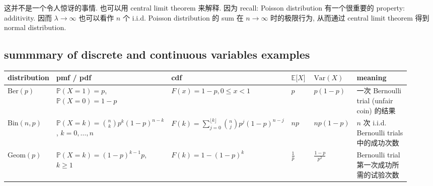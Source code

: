 这并不是一个令人惊讶的事情. 也可以用 central limit theorem 来解释. 因为 recall: Poisson distribution 有一个很重要的 property: additivity. 因而 \(\mathit{\lambda}\rightarrow\infty\) 也可以看作 \(\mathit{n}\) 个 i.i.d. Poisson distribution 的 sum 在 \(\mathit{n}\rightarrow\infty\) 时的极限行为, 从而通过 central limit theorem 得到 normal distribution.

\begin{landscape}
\subsection{summmary of discrete and continuous variables examples}\label{summmary-of-discrete-and-continuous-variables-examples}

{\def\LTcaptype{none} %
\footnotesize\setlength{\tabcolsep}{3pt}\renewcommand{\arraystretch}{1.4}
\begin{longtable}[]{@{}p{0.12\linewidth}p{0.25\linewidth}p{0.25\linewidth}p{0.06\linewidth}p{0.07\linewidth}p{0.18\linewidth}@{}}
\toprule\noalign{}
\textbf{distribution} & \textbf{pmf / pdf} & \textbf{cdf} & \textbf{\(\mathbb{E}\lbrack\mathit{X}\rbrack\)} & \textbf{\(\text{Var}(\mathit{X})\)} & \textbf{meaning} \\
\midrule\noalign{}
\endhead
\bottomrule\noalign{}
\endlastfoot
\(\text{Ber}(\mathit{p})\) & \(\mathbb{P}(\mathit{X} = 1) = \mathit{p}\), \(\mathbb{P}(\mathit{X} = 0) = 1 - \mathit{p}\) & \(\mathit{F}(\mathit{x}) = 1 - \mathit{p},0 \leq \mathit{x} < 1\) & \(\mathit{p}\) & \(\mathit{p}(1 - \mathit{p})\) & 一次 Bernoulli trial (unfair coin) 的结果 \\
\(\text{Bin}(\mathit{n},\mathit{p})\) & \(\mathbb{P}(\mathit{X} = \mathit{k}) = \binom{\mathit{n}}{\mathit{k}}\mathit{p}^{\mathit{k}}(1 - \mathit{p})^{\mathit{n} - \mathit{k}}\), \(\mathit{k} = 0,\ldots,\mathit{n}\) & \(\mathit{F}(\mathit{k}) = \sum_{\mathit{j} = 0}^{\lfloor\mathit{k}\rfloor}\binom{\mathit{n}}{\mathit{j}}\mathit{p}^{\mathit{j}}(1 - \mathit{p})^{\mathit{n} - \mathit{j}}\) & \(\mathit{n}\mathit{p}\) & \(\mathit{n}\mathit{p}(1 - \mathit{p})\) & \(\mathit{n}\) 次 i.i.d. Bernoulli trials 中的成功次数 \\
\(\text{Geom}(\mathit{p})\) & \(\mathbb{P}(\mathit{X} = \mathit{k}) = (1 - \mathit{p})^{\mathit{k} - 1}\mathit{p}\), \(\mathit{k} \geq 1\) & \(\mathit{F}(\mathit{k}) = 1 - (1 - \mathit{p})^{\mathit{k}}\) & \(\frac{1}{\mathit{p}}\) & \(\frac{1 - \mathit{p}}{\mathit{p}^{2}}\) & Bernoulli trial 第一次成功所需的试验次数 \\

\end{longtable}}
\end{landscape}

